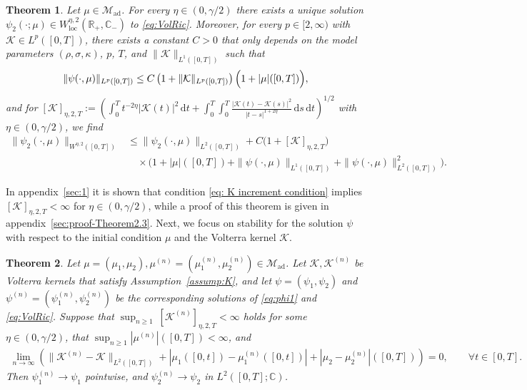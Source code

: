 \documentclass[10pt,a4paper,reqno]{amsart}
\newcommand{\C}{\mathbb{C}}
\theoremstyle{plain}
\newtheorem{theorem}{Theorem}[section]
\theoremstyle{definition}
\theoremstyle{remark}
\theoremstyle{example}
\begin{document}
\begin{theorem}\label{thm:solRicVolmeasure}
    Let $\mu \in\mathcal{M}_{\mathrm{ad}}$. For every $\eta\in(0,\gamma/2)$ there exists a unique solution $\psi_2(\cdot; \mu) \in W_{\mathrm{loc}}^{\eta, 2}(\mathbb{R}_+,\mathbb{C}_-)$ to \eqref{eq:VolRic}. Moreover, for every $p\in[2,\infty)$ with $\mathcal{K}\in L^p([0,T])$, there exists a constant $C > 0$ that only depends on the model parameters $(\rho,\sigma,\kappa)$, $p$, $T$, and $\|\mathcal{K}\|_{L^1([0,T])}$ such that
    \[
        \|\psi(\cdot, \mu)\|_{L^p([0,T])} \leq C\left (1 + \| \mathcal{K}\|_{L^{p}([0,T])}  \right)\Bigl(1 + |\mu|([0,T])\Bigr),
    \]
    and for $[\mathcal{K}]_{\eta, 2,T} := \left( \int_0^T t^{-2\eta}|\mathcal{K}(t)|^2\, \mathrm{d}t + \int_0^T \int_0^T \frac{|\mathcal{K}(t) - \mathcal{K}(s)|^2}{|t-s|^{1 + 2\eta}}\,\mathrm{d}s\,\mathrm{d}t \right)^{1/2}$ with $\eta \in (0,\gamma/2)$, we find
    \begin{align*}
    \|\psi_2(\cdot,\mu)\|_{W^{\eta,2}([0,T])} 
    &\leq \|\psi_2(\cdot, \mu)\|_{L^2([0,T])}+ C\big(1 + [\mathcal{K}]_{\eta,2,T}\big) \\
    &\quad \times
	        \Big(1 + |\mu|([0,T]) + \|\psi(\cdot,\mu)\|_{L^1([0,T])} 
	              + \|\psi(\cdot,\mu)\|_{L^2([0,T])}^2\Big).
	    \end{align*}
\end{theorem}

In appendix~\ref{sec:1} it is shown that condition \eqref{eq: K increment condition} implies $[\mathcal{K}]_{\eta, 2,T} < \infty$ for $\eta \in (0,\gamma/2)$, while a proof of this theorem is given in appendix~\ref{sec:proof-Theorem2.3}. Next, we focus on stability for the solution $\psi$ with respect to the initial condition $\mu$ and the Volterra kernel $\mathcal{K}$. 

\begin{theorem}\label{thm:stability-Lq}
    Let $\mu = (\mu_1, \mu_2), \mu^{(n)} = (\mu^{(n)}_1, \mu^{(n)}_2) \in \mathcal{M}_{\mathrm{ad}}$. Let $\mathcal{K}, \mathcal{K}^{(n)}$ be Volterra kernels that satisfy Assumption~\ref{assump:K}, and let $\psi = (\psi_1, \psi_2)$ and $\psi^{(n)} = (\psi^{(n)}_1, \psi^{(n)}_2)$ be the corresponding solutions of \eqref{eq:phi1} and \eqref{eq:VolRic}. 
    Suppose that $\sup_{n \geq 1}\  [\mathcal{K}^{(n)}]_{\eta,2,T} < \infty$ holds for some $\eta \in (0,\gamma/2)$, that $\sup_{n\ge1}|\mu^{(n)}|([0,T])<\infty$, and
    \begin{align*}
        \lim_{n \to \infty} \left( \| \mathcal{K}^{(n)} - \mathcal{K} \|_{L^2([0,T])} + |\mu_1([0,t]) - \mu^{(n)}_1([0,t])| + |\mu_2 - \mu_2^{(n)}|([0,T]) \right)= 0, \qquad \forall t \in [0,T].
	    \end{align*}
	    Then $\psi_1^{(n)} \longrightarrow \psi_1$ pointwise, and $\psi_2^{(n)} \longrightarrow \psi_2$ in $L^{2}([0,T]; \C)$.
\end{theorem}
\end{document}
